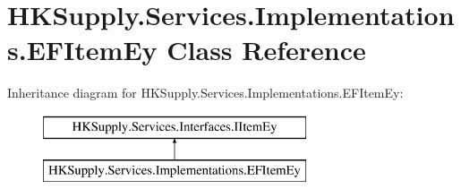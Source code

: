 \hypertarget{class_h_k_supply_1_1_services_1_1_implementations_1_1_e_f_item_ey}{}\section{H\+K\+Supply.\+Services.\+Implementations.\+E\+F\+Item\+Ey Class Reference}
\label{class_h_k_supply_1_1_services_1_1_implementations_1_1_e_f_item_ey}
Inheritance diagram for H\+K\+Supply.\+Services.\+Implementations.\+E\+F\+Item\+Ey\+:\begin{figure}[H]
\begin{center}
\leavevmode
\includegraphics[height=2.000000cm]{class_h_k_supply_1_1_services_1_1_implementations_1_1_e_f_item_ey}
\end{center}
\end{figure}
